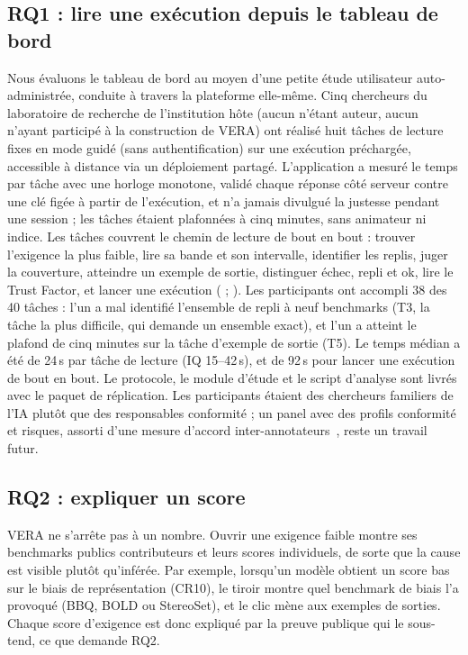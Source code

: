\documentclass[10pt,conference]{IEEEtran}
\begin{document}
\subsection{RQ1 : lire une exécution depuis le tableau de bord}
Nous évaluons le tableau de bord au moyen d'une petite étude utilisateur auto-administrée, conduite à travers la plateforme elle-même.
Cinq chercheurs du laboratoire de recherche de l'institution hôte (aucun n'étant auteur, aucun n'ayant participé à la construction de VERA) ont réalisé huit tâches de lecture fixes en mode guidé (sans authentification) sur une exécution préchargée, accessible à distance via un déploiement partagé.
L'application a mesuré le temps par tâche avec une horloge monotone, validé chaque réponse côté serveur contre une clé figée à partir de l'exécution, et n'a jamais divulgué la justesse pendant une session ; les tâches étaient plafonnées à cinq minutes, sans animateur ni indice.
Les tâches couvrent le chemin de lecture de bout en bout : trouver l'exigence la plus faible, lire sa bande et son intervalle, identifier les replis, juger la couverture, atteindre un exemple de sortie, distinguer échec, repli et ok, lire le Trust Factor, et lancer une exécution ( ; ).
Les participants ont accompli 38 des 40 tâches : l'un a mal identifié l'ensemble de repli à neuf benchmarks (T3, la tâche la plus difficile, qui demande un ensemble exact), et l'un a atteint le plafond de cinq minutes sur la tâche d'exemple de sortie (T5).
Le temps médian a été de 24\,s par tâche de lecture (IQ 15--42\,s), et de 92\,s pour lancer une exécution de bout en bout.
Le protocole, le module d'étude et le script d'analyse sont livrés avec le paquet de réplication.
Les participants étaient des chercheurs familiers de l'IA plutôt que des responsables conformité ; un panel avec des profils conformité et risques, assorti d'une mesure d'accord inter-annotateurs~\cite{hayes2007krippendorff,studtmann2023histree}, reste un travail futur.

\subsection{RQ2 : expliquer un score}
VERA ne s'arrête pas à un nombre.
Ouvrir une exigence faible montre ses benchmarks publics contributeurs et leurs scores individuels, de sorte que la cause est visible plutôt qu'inférée.
Par exemple, lorsqu'un modèle obtient un score bas sur le biais de représentation (CR10), le tiroir montre quel benchmark de biais l'a provoqué (BBQ, BOLD ou StereoSet), et le clic mène aux exemples de sorties.
Chaque score d'exigence est donc expliqué par la preuve publique qui le sous-tend, ce que demande RQ2.
\end{document}
